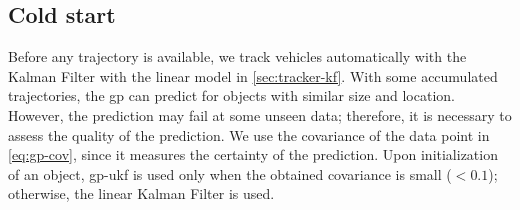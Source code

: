 \subsection{Cold start}
Before any trajectory is available, we track vehicles automatically with the Kalman Filter with the linear model in \ref{sec:tracker-kf}. 
With some accumulated trajectories, the \gls{gp} can predict for objects with similar size and location.
However, the prediction may fail at some unseen data; therefore, it is necessary to assess the quality of the prediction.
We use the covariance of the data point in \ref{eq:gp-cov}, since it measures the certainty of the prediction. 
Upon initialization of an object, \gls{gp}-\gls{ukf} is used only when the obtained covariance is small ($< 0.1$); otherwise, the linear Kalman Filter is used.


